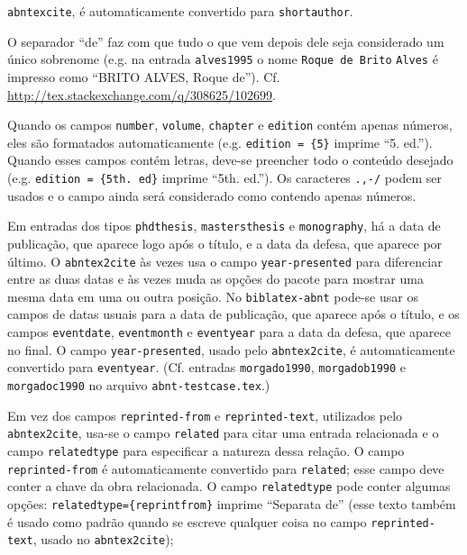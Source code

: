 \documentclass[a4paper]{article}
\begin{document}
\begin{itemize}
\begin{sloppypar}
    \texttt{abntex\-cite}, é automaticamente convertido para
    \texttt{shortauthor}.
  \item O separador ``de'' faz com que tudo o que vem depois dele seja
    considerado um único sobrenome (e.g. na entrada \texttt{alves1995} o nome
    \texttt{Roque de Brito} \texttt{Alves} é impresso como ``BRITO ALVES,
    Roque de''). Cf. \url{http://tex.stackexchange.com/q/308625/102699}.
  \item Quando os campos \texttt{number}, \texttt{volume}, \texttt{chapter} e
    \texttt{edition} contém apenas números, eles são formatados
    automaticamente (e.g. \texttt{edition = \{5\}} imprime ``5. ed.''). Quando
    esses campos contém letras, deve-se preencher todo o conteúdo desejado
    (e.g. \verb"edition = {5th. ed}" imprime ``5th. ed.''). Os caracteres
    \texttt{.,-/} podem ser usados e o campo ainda será considerado como
    contendo apenas números.
  \item Em entradas dos tipos \texttt{phdthesis}, \texttt{mastersthesis} e
    \texttt{monography}, há a data de publicação, que aparece logo após o
    título, e a data da defesa, que aparece por último. O
    \texttt{abntex2cite}
    às vezes usa o campo \texttt{year-presented} para diferenciar entre as
    duas
    datas e às vezes muda as opções do pacote para mostrar uma mesma data
    em
    uma ou outra posição. No \texttt{biblatex-abnt} pode-se usar os campos
    de
    datas usuais para a data de publicação, que aparece após o título, e
    os campos \texttt{eventdate}, \texttt{eventmonth} e \texttt{eventyear}
    para a
    data da defesa, que aparece no final. O campo \texttt{year-presented},
    usado pelo \texttt{abntex2cite}, é automaticamente convertido para
    \texttt{eventyear}. (Cf. entradas \texttt{morgado1990},
    \texttt{morgadob1990} e \texttt{morgadoc1990} no arquivo
    \texttt{abnt-testcase.tex}.)
  \item Em vez dos campos \texttt{reprinted-from} e \texttt{reprinted-text},
    utilizados pelo \texttt{abntex2cite}, usa-se o campo \texttt{related} para
    citar uma entrada relacionada e o campo \texttt{relatedtype} para
    especificar a natureza dessa relação. O campo \texttt{reprinted-from} é
    automaticamente convertido para \texttt{related}; esse campo deve conter a
    chave da obra relacionada. O campo \texttt{relatedtype} pode conter
    algumas
    opções: \texttt{relatedtype=\{reprintfrom\}} imprime ``Separata de''
    (esse texto também é usado como padrão quando se escreve qualquer coisa
    no campo \texttt{reprinted-text}, usado no \texttt{abntex2cite});

\end{sloppypar}
\end{itemize}
\end{document}
